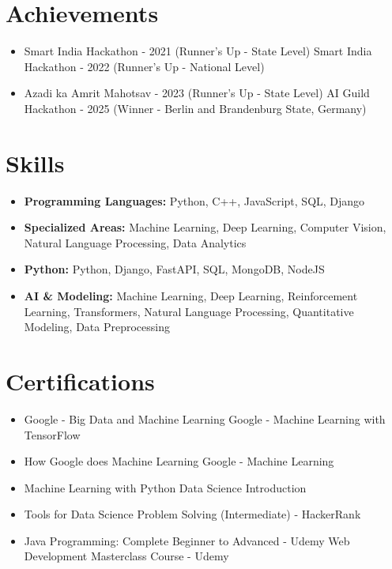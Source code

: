 \documentclass[a4paper,10pt]{article}
\begin{document}
\section*{Achievements}
\begin{itemize}
\item Smart India Hackathon - 2021 (Runner's Up - State Level) \hfill Smart India Hackathon - 2022 (Runner's Up - National Level)
\item Azadi ka Amrit Mahotsav - 2023 (Runner's Up - State Level) \hfill AI Guild Hackathon - 2025 (Winner - Berlin and Brandenburg State, Germany)
\end{itemize}

\section*{Skills}
\begin{itemize}
  \item \textbf{Programming Languages:} Python, C++, JavaScript, SQL, Django
  \item \textbf{Specialized Areas:} Machine Learning, Deep Learning, Computer Vision, Natural Language Processing, Data Analytics
  \item \textbf{Python:} Python, Django, FastAPI, SQL, MongoDB, NodeJS
  \item \textbf{AI \& Modeling:} Machine Learning, Deep Learning, Reinforcement Learning, Transformers, Natural Language Processing, Quantitative Modeling, Data Preprocessing
\end{itemize}

\section*{Certifications}
\begin{itemize}
\item Google - Big Data and Machine Learning \hfill Google - Machine Learning with TensorFlow
\item How Google does Machine Learning \hfill Google - Machine Learning
\item Machine Learning with Python \hfill Data Science Introduction
\item Tools for Data Science \hfill Problem Solving (Intermediate) - HackerRank
\item Java Programming: Complete Beginner to Advanced - Udemy \hfill Web Development Masterclass Course - Udemy
\end{itemize}
\end{document}
